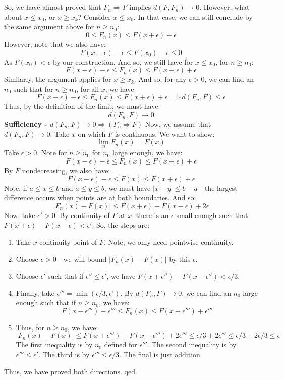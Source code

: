\documentclass[12pt,a4paper]{article}
\newcommand{\1}[1]{\mathbbm{1}\left\{ #1 \right\}}
\begin{document}
\\\\
So, we have almost proved that $F_n \Rightarrow F$ implies $d(F,F_n) \to 0$. However, what about $x \leq x_0$, or $x \geq x_k$? Consider $x \leq x_0$. In that case, we can still conclude by the same argument above for $n \geq n_0$:
$$
	0 \leq F_n(x) \leq F(x + \epsilon) + \epsilon
$$
However, note that we also have:
$$
	F(x - \epsilon) - \epsilon \leq F(x_0) - \epsilon \leq 0
$$
As $F(x_0) < \epsilon$ by our construction. And so, we still have for $x \leq x_0$, for $n \geq n_0$:
$$
	F(x - \epsilon) - \epsilon \leq F_n(x) \leq F(x + \epsilon) + \epsilon
$$
Similarly, the argument applies for $x \geq x_k$. And so, for any $\epsilon > 0$, we can find an $n_0$ such that for $n \geq n_0$, for all $x$, we have:
$$
	F(x - \epsilon) - \epsilon \leq F_n(x) \leq F(x + \epsilon) + \epsilon \implies d(F_n,F) \leq \epsilon
$$
Thus, by the definition of the limit, we must have:
$$
	d(F_n,F) \to 0
$$
\textbf{Sufficiency - $d(F_n,F) \to 0 \Rightarrow (F_n \Rightarrow F)$} Now, we assume that $d(F_n,F) \to 0$. Take $x$ on which $F$ is continuous. We want to show:
$$
	\lim_n F_n(x) = F(x)
$$
Take $\epsilon > 0$. Note for $n \geq n_0$ for $n_0$ large enough, we have:
$$
	F(x - \epsilon) - \epsilon \leq F_n(x) \leq F(x + \epsilon) + \epsilon
$$
By $F$ nondecreasing, we also have:
$$
	F(x - \epsilon) - \epsilon \leq F(x) \leq F(x + \epsilon) + \epsilon
$$
Note, if $a \leq x \leq b$ and $a \leq y \leq b$, we must have $|x - y| \leq b - a$ - the largest difference occurs when points are at both boundaries. And so:
$$
	\left|F_n(x) - F(x)\right| \leq F(x + \epsilon) - F(x - \epsilon) + 2\epsilon
$$
Now, take $\epsilon' > 0$. By continuity of $F$ at $x$, there is an $\epsilon$ small enough such that $F(x + \epsilon) - F(x - \epsilon) < \epsilon'$. So, the steps are:
\begin{enumerate}
	\item Take $x$ continuity point of $F$. Note, we only need pointwise continuity. 
	\item Choose $\epsilon > 0$ - we will bound $\left|F_n(x) - F(x)\right|$ by this $\epsilon$.
	\item Choose $\epsilon'$ such that if $\epsilon'' \leq \epsilon'$, we have $F(x + \epsilon'') - F(x - \epsilon'') < \epsilon/3$.
	\item Finally, take $\epsilon''' = \min(\epsilon/3,\epsilon')$. By $d(F_n,F) \to 0$, we can find an $n_0$ large enough such that if $n \geq n_0$, we have:
	$$
		F(x - \epsilon''') - \epsilon''' \leq F_n(x) \leq F(x + \epsilon''') + \epsilon'''
	$$
	\item Thus, for $n \geq n_0$, we have:
	$$
		\left|F_n(x) - F(x)\right| \leq
		F(x + \epsilon''') - F(x - \epsilon''') + 2\epsilon''' \leq
		\epsilon/3 + 2\epsilon''' \leq \epsilon/3 + 2\epsilon/3 \leq \epsilon
	$$
	The first inequality is by $n_0$ defined for $\epsilon'''$. The second inequality is by $\epsilon''' \leq \epsilon'$. The third is by $\epsilon''' \leq \epsilon/3$. The final is just addition.
	 
\end{enumerate}
Thus, we have proved both directions. qed.
\end{document}
